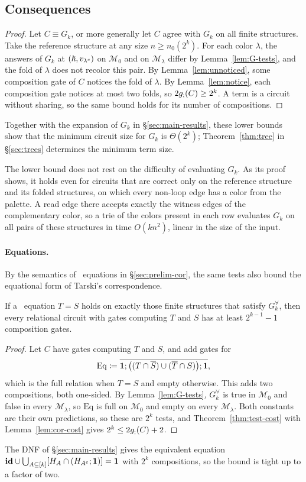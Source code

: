 \subsection{Consequences}\label{sec:query-bounds}
\mainbounds*
\begin{proof}
Let $C\equiv G_k$, or more generally let $C$ agree with $G_k$
on all finite structures. Take the reference structure at any size
$n\ge n_0(2^k)$. For each color $\lambda$, the answers of $G_k$
at $(\hslash,v_{\lambda^c})$ on $\mathcal M_0$ and on $\mathcal M_\lambda$ differ
by Lemma~\ref{lem:G-tests}, and the fold of $\lambda$ does not recolor
this pair. By Lemma~\ref{lem:unnoticed}, some composition gate of $C$
notices the fold of $\lambda$. By Lemma~\ref{lem:notice}, each
composition gate notices at most two folds, so $2g_{;}(C)\ge2^k$. A term
is a circuit without sharing, so the same bound holds for its number of
compositions.
\end{proof}
Together with the expansion of $G_k$ in \S\ref{sec:main-results}, these
lower bounds show that the minimum circuit size for $G_k$ is
$\Theta(2^k)$; Theorem~\ref{thm:tree} in \S\ref{sec:trees}
determines the minimum term size.

The lower bound does not rest on the difficulty of evaluating $G_k$. As
its proof shows, it holds even for circuits that are correct only on the
reference structure and its folded structures, on which every non-loop
edge has a color from the palette. A read edge there accepts exactly the
witness edges of the complementary color, so a trie of the colors
present in each row evaluates $G_k$ on all pairs of these structures in
time $O(kn^2)$, linear in the size of the input.

\paragraph{Equations.}
By the semantics of \CoR\ equations in \S\ref{sec:prelim-cor},
the same tests also bound the equational form of Tarski's correspondence.
\begin{corollary}\label{cor:equations}
If a \CoR\ equation $T=S$ holds on exactly those finite structures that
satisfy $G_k^\forall$, then every relational circuit with gates computing
$T$ and $S$ has at least $2^{k-1}-1$ composition gates.
\end{corollary}
\begin{proof}
Let $C$ have gates computing $T$ and $S$, and add gates for
\[
 \mathrm{Eq}\coloneqq\overline{\mathbf{1};\bigl((T\cap\overline S)\cup(\overline T\cap S)\bigr);\mathbf{1}},
\]
which is the full relation when $T=S$ and empty otherwise. This adds two
compositions, both one-sided. By Lemma~\ref{lem:G-tests}, $G_k^\forall$
is true in $\mathcal M_0$ and false in every $\mathcal M_\lambda$, so
$\mathrm{Eq}$ is full on $\mathcal M_0$ and empty on every
$\mathcal M_\lambda$. Both constants are their own predictions, so these
are $2^k$ tests, and Theorem~\ref{thm:test-cost} with
Lemma~\ref{lem:cor-cost} gives $2^k\le2g_{;}(C)+2$.
\end{proof}
The DNF of \S\ref{sec:main-results} gives the equivalent equation
$\mathbf{id}\cup\bigcup_{A\subseteq[k]}[H_A\cap(H_{A^c};\mathbf{1})]=\mathbf{1}$
with $2^k$ compositions, so the bound is tight up to a factor of two.

